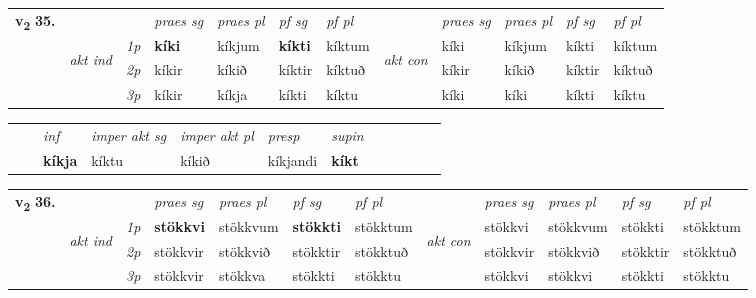 \begin{tabular}{llllllllllll} \toprule
\multirow{4}{*}{{{\textbf{v{\textsubscript{2}}} \Large{\textbf{35.}}}}}  & &   &  \textit{praes sg}  & \textit{praes pl}  &\textit{ pf sg} & \textit{pf pl} &  &  \textit{praes sg}  & \textit{praes pl}  & \textit{pf sg} & \textit{pf pl } \\*
	\cmidrule{4-7} \cmidrule{9-12}
 & \multirow{3}{*}{\begin{turn}{90}\textit{akt ind}\end{turn}} & {\textit{1p}} & \textbf{kíki} & kíkjum    & \textbf{kíkti} & kíktum & \multirow{3}{*}{\begin{turn}{90}\textit{akt con}\end{turn}} &kíki & kíkjum & kíkti & kíktum\\*
& &  {\textit{2p}} &  kíkir  & kíkið   & kíktir & kíktuð & & kíkir & kíkið & kíktir & kíktuð \\*
& &  {\textit{3p}} & kíkir & kíkja   & kíkti & kíktu & & kíki & kíki& kíkti & kíktu  \\*
\cmidrule{4-7} \cmidrule{9-12}
\end{tabular}


\begin{tabular}{llllllllllll}
 & & \textit{inf} & \textit{imper akt sg} & \textit{imper akt pl}   & \textit{presp} & \textit{supin}       \\*
  & & \textbf{kíkja} & kíktu  & kíkið   & kíkjandi &  \textbf{kíkt}   \\*
\cmidrule{1-12}
\end{tabular}



\begin{tabular}{llllllllllll} \toprule
\multirow{4}{*}{{{\textbf{v{\textsubscript{2}}} \Large{\textbf{36.}}}}}  & &   &  \textit{praes sg}  & \textit{praes pl}  &\textit{ pf sg} & \textit{pf pl} &  &  \textit{praes sg}  & \textit{praes pl}  & \textit{pf sg} & \textit{pf pl } \\*
	\cmidrule{4-7} \cmidrule{9-12}
 & \multirow{3}{*}{\begin{turn}{90}\textit{akt ind}\end{turn}} & {\textit{1p}} & \textbf{stökkvi} & stökkvum    & \textbf{stökkti} & stökktum & \multirow{3}{*}{\begin{turn}{90}\textit{akt con}\end{turn}} &stökkvi & stökkvum & stökkti & stökktum\\*
& &  {\textit{2p}} &  stökkvir  & stökkvið   & stökktir & stökktuð & & stökkvir & stökkvið & stökktir & stökktuð \\*
& &  {\textit{3p}} & stökkvir & stökkva   & stökkti & stökktu & & stökkvi & stökkvi& stökkti & stökktu  \\*
\cmidrule{4-7} \cmidrule{9-12}
\end{tabular}


